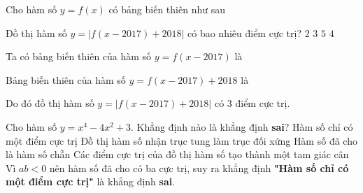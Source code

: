 \begin{ex}%
Cho hàm số $y=f(x)$ có bảng biến thiên như sau
\begin{center}
\end{center}
Đồ thị hàm số $y=\left | f(x-2017) +2018\right |$ có bao nhiêu điểm cực trị?
 \choice 
{$2$}
{\True $3$}
{$5$}
{$4$}
\loigiai
{
Ta có bảng biến thiên của hàm số $y= f(x-2017)$ là 
\begin{center}
\end{center}
Bảng biến thiên của hàm số $ y=f(x-2017) +2018$ là
\begin{center}
\end{center}
Do đó đồ thị hàm số $y=\left | f(x-2017) +2018\right |$ có $3$ điểm cực trị.
}
\end{ex}


\begin{ex}%
Cho hàm số $y=x^4 -4x^2 +3$. Khẳng định nào là khẳng định \textbf{sai}?
 \choice 
{\True Hàm số chỉ có một điểm cực trị}
{Đồ thị hàm số nhận trục tung làm trục đối xứng}
{Hàm số đã cho là hàm số chẵn}
{Các điểm cực trị của đồ thị hàm số tạo thành một tam giác cân}
\loigiai
{
Vì $ab<0$ nên hàm số đã cho có ba cực trị, suy ra khẳng định \textbf{"Hàm số chỉ có một điểm cực trị"} là khẳng định \textbf{sai}.
}
\end{ex}


